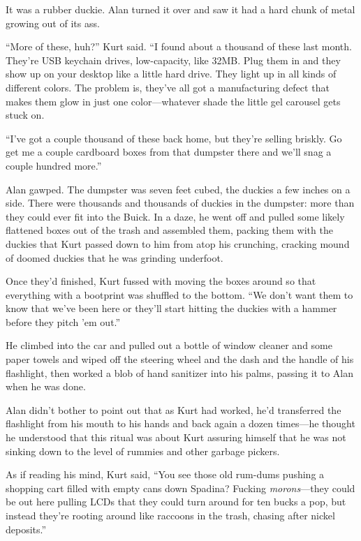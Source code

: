It was a rubber duckie.  Alan turned it over and saw it had a hard
chunk of metal growing out of its ass.

``More of these, huh?'' Kurt said.  ``I found about a thousand of
these last month.  They're USB keychain drives, low-capacity, like
32MB.  Plug them in and they show up on your desktop like a little
hard drive.  They light up in all kinds of different colors.  The
problem is, they've all got a manufacturing defect that makes them
glow in just one color---whatever shade the little gel carousel gets
stuck on.

``I've got a couple thousand of these back home, but they're selling
briskly.  Go get me a couple cardboard boxes from that dumpster there
and we'll snag a couple hundred more.''

Alan gawped.  The dumpster was seven feet cubed, the duckies a few
inches on a side.  There were thousands and thousands of duckies in
the dumpster:  more than they could ever fit into the Buick.  In a
daze, he went off and pulled some likely flattened boxes out of the
trash and assembled them, packing them with the duckies that Kurt
passed down to him from atop his crunching, cracking mound of doomed
duckies that he was grinding underfoot.

Once they'd finished, Kurt fussed with moving the boxes around so that
everything with a bootprint was shuffled to the bottom.  ``We don't
want them to know that we've been here or they'll start hitting the
duckies with a hammer before they pitch 'em out.''

He climbed into the car and pulled out a bottle of window cleaner and
some paper towels and wiped off the steering wheel and the dash and
the handle of his flashlight, then worked a blob of hand sanitizer
into his palms, passing it to Alan when he was done.

Alan didn't bother to point out that as Kurt had worked, he'd
transferred the flashlight from his mouth to his hands and back again
a dozen times---he thought he understood that this ritual was about
Kurt assuring himself that he was not sinking down to the level of
rummies and other garbage pickers.

As if reading his mind, Kurt said, ``You see those old rum-dums
pushing a shopping cart filled with empty cans down Spadina?  Fucking
\textit{morons}---they could be out here pulling LCDs that they could
turn around for ten bucks a pop, but instead they're rooting around
like raccoons in the trash, chasing after nickel deposits.''


